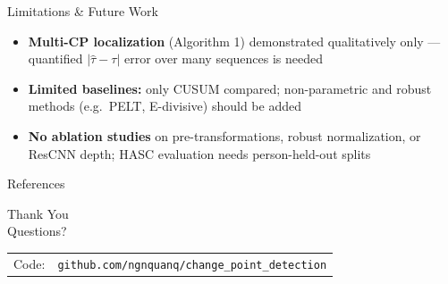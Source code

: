 \documentclass[8.5pt]{beamer}
\begin{document}
\begin{frame}{Limitations \& Future Work}
  \begin{itemize}
    \setlength\itemsep{10pt}
    \item \textbf{Multi-CP localization} (Algorithm 1) demonstrated qualitatively only —
          quantified $|\hat\tau - \tau|$ error over many sequences is needed
    \item \textbf{Limited baselines:} only CUSUM \cite{page1954cusum} compared;
          non-parametric and robust methods (e.g.\ PELT, E-divisive) should be added
    \item \textbf{No ablation studies} on pre-transformations, robust normalization,
          or ResCNN depth; HASC evaluation needs person-held-out splits
  \end{itemize}
\end{frame}

\begin{frame}[allowframebreaks]{References}
  
\end{frame}

\begin{frame}
  \begin{center}
    \Huge Thank You\\[16pt]
    \large Questions?\\[24pt]
    \normalsize
    \begin{tabular}{rl}
      Code:    & \texttt{github.com/ngnquanq/change\_point\_detection}
    \end{tabular}
  \end{center}
\end{frame}
\end{document}
